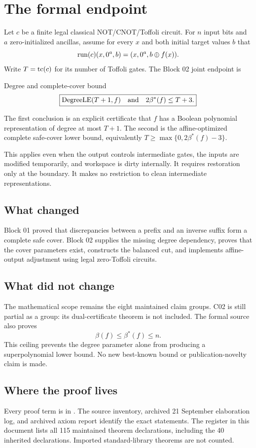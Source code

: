 \section*{The formal endpoint}
Let $c$ be a finite legal classical NOT/CNOT/Toffoli circuit. For $n$ input bits and $a$ zero-initialized ancillas, assume for every $x$ and both initial target values $b$ that
\[
\operatorname{run}(c)(x,0^a,b)=(x,0^a,b\mathbin{\oplus} f(x)).
\]
Write $T=\operatorname{tc}(c)$ for its number of Toffoli gates. The Block 02 joint endpoint is
\begin{statusbox}{Degree and complete-cover bound}
\[
\boxed{\operatorname{DegreeLE}(T+1,f)\quad\text{and}\quad 2\beta^*(f)\le T+3.}
\]
\end{statusbox}
The first conclusion is an explicit certificate that $f$ has a Boolean polynomial representation of degree at most $T+1$. The second is the affine-optimized complete safe-cover lower bound, equivalently $T\ge\max\{0,2\beta^*(f)-3\}$.

This applies even when the output controls intermediate gates, the inputs are modified temporarily, and workspace is dirty internally. It requires restoration only at the boundary. It makes no restriction to clean intermediate representations.

\subsection*{What changed}
Block 01 proved that discrepancies between a prefix and an inverse suffix form a complete safe cover. Block 02 supplies the missing degree dependency, proves that the cover parameters exist, constructs the balanced cut, and implements affine-output adjustment using legal zero-Toffoli circuits.

\subsection*{What did not change}
The mathematical scope remains the eight maintained claim groups. C02 is still partial as a group: its dual-certificate theorem is not included. The formal source also proves
\[
\beta(f)\le\beta^*(f)\le n.
\]
This ceiling prevents the degree parameter alone from producing a superpolynomial lower bound. No new best-known bound or publication-novelty claim is made.

\subsection*{Where the proof lives}
Every proof term is in . The source inventory, archived 21 September elaboration log, and archived axiom report identify the exact statements. The register in this document lists all 115 maintained theorem declarations, including the 40 inherited declarations. Imported standard-library theorems are not counted.

